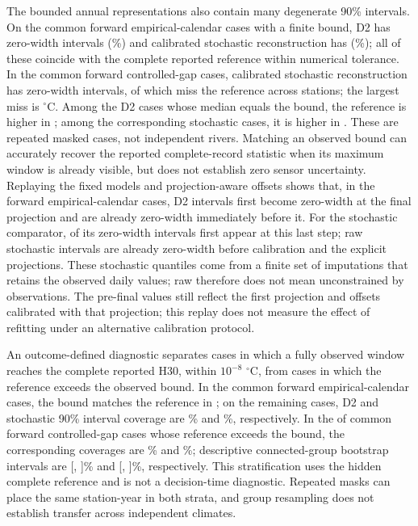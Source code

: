 \documentclass[draft,linenumbers]{agujournal2025}
\begin{document}
The bounded annual representations also contain many degenerate 90\% intervals. On the \SPCalendarCommon{} common forward empirical-calendar cases with a finite bound, D2 has \SPCalendarDTwoZero{} zero-width intervals (\SPCalendarDTwoPercent\%) and calibrated stochastic reconstruction has \SPCalendarClassicZero{} (\SPCalendarClassicPercent\%); all of these coincide with the complete reported reference within numerical tolerance. In the \SPCrossCommon{} common forward controlled-gap cases, calibrated stochastic reconstruction has \SPCrossClassicZero{} zero-width intervals, \SPCrossClassicMiss{} of which miss the reference across \SPCrossClassicMissStations{} stations; the largest miss is \SPCrossClassicMaxMiss{}$^{\circ}$C. Among the \SPCrossDTwoMedian{} D2 cases whose median equals the bound, the reference is higher in \SPCrossDTwoMedianAbove{}; among the \SPCrossClassicMedian{} corresponding stochastic cases, it is higher in \SPCrossClassicMedianAbove{}. These are repeated masked cases, not independent rivers. Matching an observed bound can accurately recover the reported complete-record statistic when its maximum window is already visible, but does not establish zero sensor uncertainty. Replaying the fixed models and projection-aware offsets shows that, in the forward empirical-calendar cases, \SPCalendarDTwoCreatedLast{} D2 intervals first become zero-width at the final projection and \SPCalendarDTwoBeforeLast{} are already zero-width immediately before it. For the stochastic comparator, \SPCalendarClassicCreatedLast{} of its zero-width intervals first appear at this last step; \SPCalendarClassicRawZero{} raw stochastic intervals are already zero-width before calibration and the explicit projections. These stochastic quantiles come from a finite set of imputations that retains the observed daily values; raw therefore does not mean unconstrained by observations. The pre-final values still reflect the first projection and offsets calibrated with that projection; this replay does not measure the effect of refitting under an alternative calibration protocol.

An outcome-defined diagnostic separates cases in which a fully observed window reaches the complete reported H30, within $10^{-8}$ $^{\circ}$C, from cases in which the reference exceeds the observed bound. In the \PVCalendarAll{} common forward empirical-calendar cases, the bound matches the reference in \PVCalendarVisible{}; on the remaining \PVCalendarHidden{} cases, D2 and stochastic 90\% interval coverage are \PVCalendarDTwoCoverage\% and \PVCalendarClassicCoverage\%, respectively. In the \PVCrossHidden{} of \PVCrossAll{} common forward controlled-gap cases whose reference exceeds the bound, the corresponding coverages are \PVCrossDTwoCoverage\% and \PVCrossClassicCoverage\%; descriptive connected-group bootstrap intervals are [\PVCrossDTwoCILow{}, \PVCrossDTwoCIHigh{}]\% and [\PVCrossClassicCILow{}, \PVCrossClassicCIHigh{}]\%, respectively. This stratification uses the hidden complete reference and is not a decision-time diagnostic. Repeated masks can place the same station-year in both strata, and group resampling does not establish transfer across independent climates.
\end{document}
